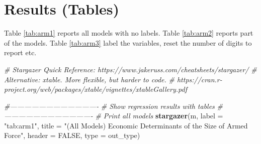\documentclass[11pt,]{article}
\newenvironment{Shaded}{\begin{snugshade}}{\end{snugshade}}
\newcommand{\KeywordTok}[1]{\textcolor[rgb]{0.13,0.29,0.53}{\textbf{#1}}}
\newcommand{\DataTypeTok}[1]{\textcolor[rgb]{0.13,0.29,0.53}{#1}}
\newcommand{\StringTok}[1]{\textcolor[rgb]{0.31,0.60,0.02}{#1}}
\newcommand{\CommentTok}[1]{\textcolor[rgb]{0.56,0.35,0.01}{\textit{#1}}}
\newcommand{\OtherTok}[1]{\textcolor[rgb]{0.56,0.35,0.01}{#1}}
\newcommand{\NormalTok}[1]{#1}
\begin{document}
\normalsize

\clearpage

\section{Results (Tables)}\label{results-tables}

Table \ref{tab:arm1} reports all models with no labels. Table
\ref{tab:arm2} reports part of the models. Table \ref{tab:arm3} label
the variables, reset the number of digits to report etc.

\tiny

\begin{Shaded}
\begin{Highlighting}[]
\CommentTok{# Stargazer Quick Reference: https://www.jakeruss.com/cheatsheets/stargazer/}
\CommentTok{# Alternative: xtable. More flexible, but harder to code.}
    \CommentTok{# https://cran.r-project.org/web/packages/xtable/vignettes/xtableGallery.pdf}

\CommentTok{#-------------------------------------}
\CommentTok{# Show regression results with tables}
\CommentTok{#-------------------------------------}
  \CommentTok{# Print all models}
    \KeywordTok{stargazer}\NormalTok{(m, }\DataTypeTok{label =} \StringTok{"tab:arm1"}\NormalTok{, }
              \DataTypeTok{title =} 
                \StringTok{"(All Models) Economic Determinants of the Size of Armed Force"}\NormalTok{,}
              \DataTypeTok{header =} \OtherTok{FALSE}\NormalTok{, }\DataTypeTok{type =}\NormalTok{ out_type)}
\end{Highlighting}
\end{Shaded}
\end{document}
